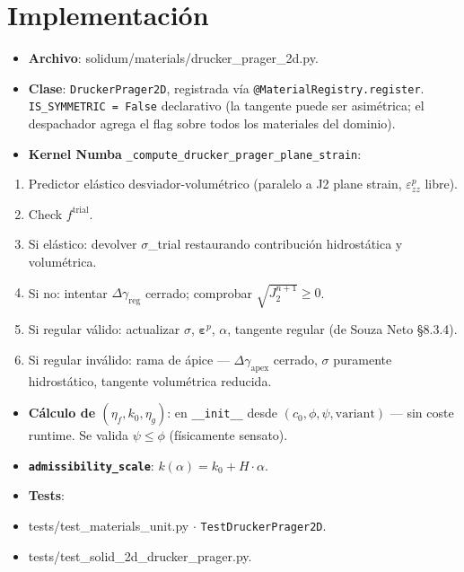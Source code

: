 \documentclass[11pt,letterpaper,oneside]{report}
\begin{document}
\section{Implementación}

\begin{itemize}
  \item \textbf{Archivo}: solidum/materials/drucker\_prager\_2d.py.
  \item \textbf{Clase}: \texttt{DruckerPrager2D}, registrada vía \texttt{@MaterialRegistry.register}. \texttt{IS\_SYMMETRIC = False} declarativo (la tangente puede ser asimétrica; el despachador agrega el flag sobre todos los materiales del dominio).
  \item \textbf{Kernel Numba} \texttt{\_compute\_drucker\_prager\_plane\_strain}:
\end{itemize}
\begin{enumerate}
  \item Predictor elástico desviador-volumétrico (paralelo a J2 plane strain, $\varepsilon^p_{zz}$ libre).
  \item Check $f^\text{trial}$.
  \item Si elástico: devolver \ensuremath{\sigma}\_trial restaurando contribución hidrostática y volumétrica.
  \item Si no: intentar $\Delta\gamma_\text{reg}$ cerrado; comprobar $\sqrt{J_2^{n+1}} \geq 0$.
  \item Si regular válido: actualizar \ensuremath{\sigma}, $\boldsymbol\varepsilon^p$, $\alpha$, tangente regular (de Souza Neto §8.3.4).
  \item Si regular inválido: rama de ápice --- $\Delta\gamma_\text{apex}$ cerrado, \ensuremath{\sigma} puramente hidrostático, tangente volumétrica reducida.
\end{enumerate}
\begin{itemize}
  \item \textbf{Cálculo de $(\eta_f, k_0, \eta_g)$}: en \texttt{\_\_init\_\_} desde $(c_0, \phi, \psi, \text{variant})$ --- sin coste runtime. Se valida $\psi \leq \phi$ (físicamente sensato).
  \item \textbf{\texttt{admissibility\_scale}}: $k(\alpha) = k_0 + H \cdot \alpha$.
  \item \textbf{Tests}:
  \item tests/test\_materials\_unit.py \ensuremath{\cdot} \texttt{TestDruckerPrager2D}.
  \item tests/test\_solid\_2d\_drucker\_prager.py.
\end{itemize}
\end{document}
